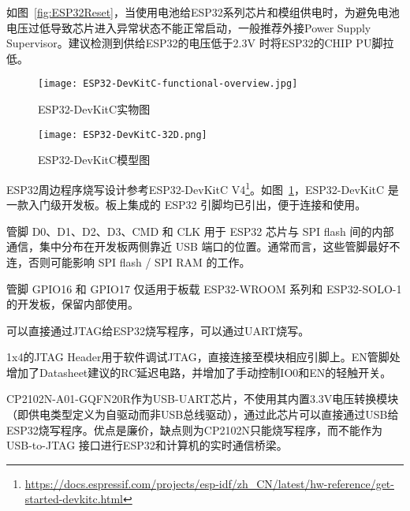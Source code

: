 如图~\ref{fig:ESP32Reset}，当使用电池给ESP32系列芯片和模组供电时，为避免电池电压过低导致芯片进入异常状态不能正常启动，一般推荐外接Power Supply Supervisor。建议检测到供给ESP32的电压低于2.3V 时将ESP32的CHIP PU脚拉低。


\begin{figure}[htbp]
    \centering
    \texttt{[image: ESP32-DevKitC-functional-overview.jpg]}
    \caption{ESP32-DevKitC实物图}
    \label{fig:ESP32-1}
\end{figure}


\begin{figure}[htbp]
    \centering
    \texttt{[image: ESP32-DevKitC-32D.png]}
    \caption{ESP32-DevKitC模型图}
    \label{fig:ESP32-2}
\end{figure}

ESP32周边程序烧写设计参考ESP32-DevKitC V4\footnote{\url{https://docs.espressif.com/projects/esp-idf/zh_CN/latest/hw-reference/get-started-devkitc.html}}。如图~\ref{fig:ESP32-1}，ESP32-DevKitC 是一款入门级开发板。板上集成的 ESP32 引脚均已引出，便于连接和使用。

管脚 D0、D1、D2、D3、CMD 和 CLK 用于 ESP32 芯片与 SPI flash 间的内部通信，集中分布在开发板两侧靠近 USB 端口的位置。通常而言，这些管脚最好不连，否则可能影响 SPI flash / SPI RAM 的工作。

管脚 GPIO16 和 GPIO17 仅适用于板载 ESP32-WROOM 系列和 ESP32-SOLO-1 的开发板，保留内部使用。

可以直接通过JTAG给ESP32烧写程序，可以通过UART烧写。

1x4的JTAG Header用于软件调试JTAG，直接连接至模块相应引脚上。EN管脚处增加了Datasheet建议的RC延迟电路，并增加了手动控制IO0和EN的轻触开关。

CP2102N-A01-GQFN20R作为USB-UART芯片，不使用其内置3.3V电压转换模块（即供电类型定义为自驱动而非USB总线驱动），通过此芯片可以直接通过USB给ESP32烧写程序。优点是廉价，缺点则为CP2102N只能烧写程序，而不能作为 USB-to-JTAG 接口进行ESP32和计算机的实时通信桥梁。

